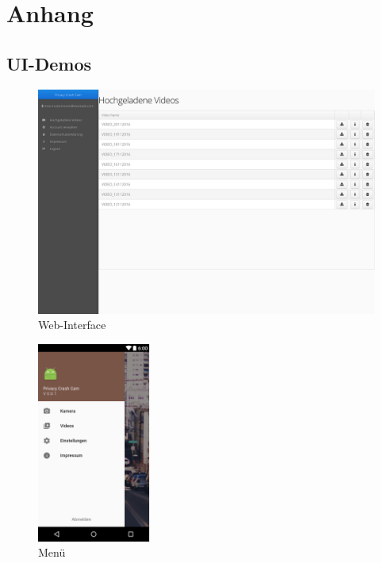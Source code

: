 \chapter{Anhang}

\section{UI-Demos}
\begin{figure}[!htbp]
	\centering
\includegraphics[width=1\textwidth]{subtopicsFuncspec/Res/UI-Demos/Webinterface.png}
	\caption{Web-Interface}
\end{figure}
\begin{figure}
	\centering
	\includegraphics[width=0.33\textwidth]{subtopicsFuncspec/Res/Mockups/Portrait_camera_view_menu.png}
	\caption{Menü}
\end{figure}

